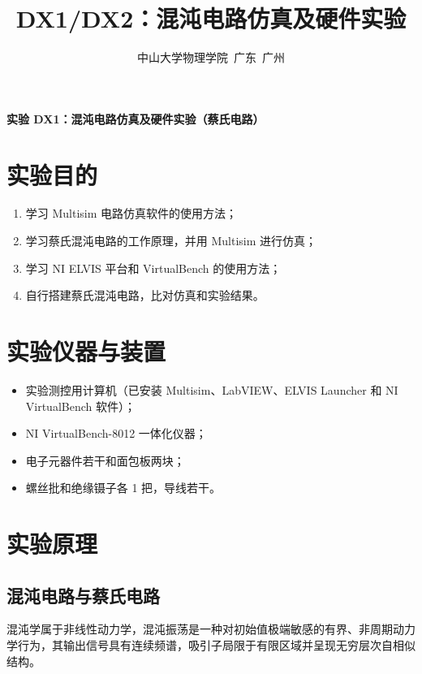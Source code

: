 \documentclass[a4paper,8pt,twocolumn]{article}
\title{
  \textbf{DX1/DX2：混沌电路仿真及硬件实验}
}
\author{
  \small 中山大学物理学院~广东~广州
}
\begin{document}
\maketitle
\newpage

\begin{center}
  {\large\bfseries 实验 DX1：混沌电路仿真及硬件实验（蔡氏电路）}
\end{center}

\section{实验目的}

\begin{enumerate}
  \item 学习 Multisim 电路仿真软件的使用方法；
  \item 学习蔡氏混沌电路的工作原理，并用 Multisim 进行仿真；
  \item 学习 NI ELVIS 平台和 VirtualBench 的使用方法；
  \item 自行搭建蔡氏混沌电路，比对仿真和实验结果。
\end{enumerate}

\section{实验仪器与装置}

\begin{itemize}
  \item 实验测控用计算机（已安装 Multisim、LabVIEW、ELVIS Launcher 和 NI VirtualBench 软件）；
  \item NI VirtualBench-8012 一体化仪器；
  \item 电子元器件若干和面包板两块；
  \item 螺丝批和绝缘镊子各 1 把，导线若干。
\end{itemize}

\section{实验原理}

\subsection{混沌电路与蔡氏电路}

混沌学属于非线性动力学，混沌振荡是一种对初始值极端敏感的有界、非周期动力学行为，其输出信号具有连续频谱，吸引子局限于有限区域并呈现无穷层次自相似结构。
\end{document}
